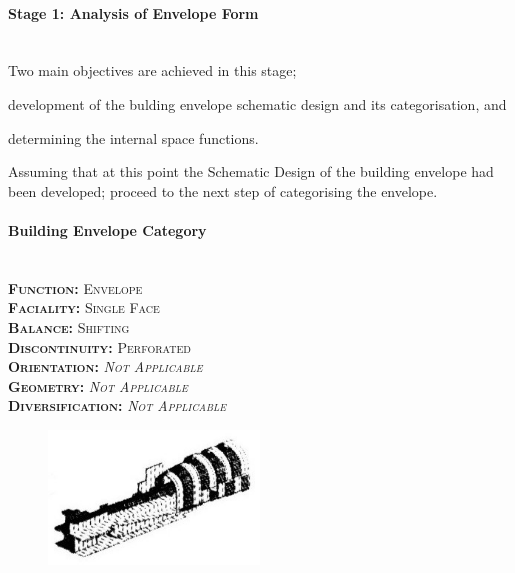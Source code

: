 \paragraph{Stage 1: Analysis of Envelope Form}\mbox{}\\[2mm]

Two main objectives are achieved in this stage; \begin{inparaenum}[a)] \item development of the bulding envelope schematic design and its categorisation, and \item determining the internal space functions.\end{inparaenum}

Assuming that at this point the Schematic Design of the building envelope had been developed; proceed to the next step of categorising the envelope.

\setlength{\columnseprule}{0pt}
\begin{multicols}{2}
	\paragraph{Building Envelope Category}\mbox{}\\
	\vspace {0.5cm}	
	\small \textsc{\textbf{Function:} Envelope\\
	\vspace {0.3cm}
	\textbf{Faciality:} Single Face\\
	\vspace {0.3cm}
	\textbf{Balance:} Shifting\\
	\vspace {0.3cm}
	\textbf{Discontinuity:} Perforated\\
	\vspace {0.3cm}
	\textbf{Orientation:} \emph{Not Applicable}\\
	\vspace {0.3cm}
	\textbf{Geometry:} \emph{Not Applicable}\\
	\vspace {0.3cm}
	\textbf{Diversification:} \emph{Not Applicable}\\}
	\normalsize
	\columnbreak
	\vspace{3.5cm}
	\begin{figure}[H]
		\centering
		\includegraphics[width=0.5\textwidth]{./Images/13-Envelope4}
	\end{figure}
\end{multicols}
\vspace{-5mm}

